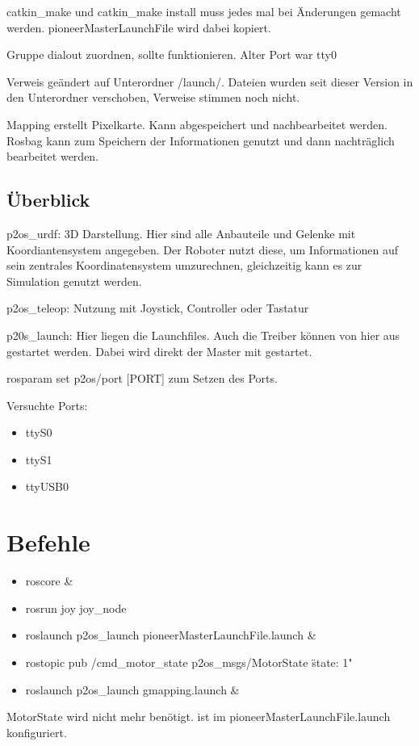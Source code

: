 \documentclass{scrartcl}%
\begin{document}
catkin\_make und catkin\_make install muss jedes mal bei Änderungen gemacht werden. pioneerMasterLaunchFile wird dabei kopiert.

Gruppe dialout zuordnen, sollte funktionieren. Alter Port war tty0

Verweis geändert auf Unterordner /launch/. Dateien wurden seit dieser Version in den Unterordner verschoben, Verweise stimmen noch nicht.

Mapping erstellt Pixelkarte. Kann abgespeichert und nachbearbeitet werden. Rosbag kann zum Speichern der Informationen genutzt und dann nachträglich bearbeitet werden.

\subsection{Überblick}
p2os\_urdf: 3D Darstellung. Hier sind alle Anbauteile und Gelenke mit Koordiantensystem angegeben. Der Roboter nutzt diese, um Informationen auf sein zentrales Koordinatensystem umzurechnen, gleichzeitig kann es zur Simulation genutzt werden.

p2os\_teleop: Nutzung mit Joystick, Controller oder Tastatur

p20s\_launch: Hier liegen die Launchfiles. Auch die Treiber können von hier aus gestartet werden. Dabei wird direkt der Master mit gestartet.

rosparam set p2os/port [PORT] zum Setzen des Ports.

Versuchte Ports: 
\begin{itemize}
	\item ttyS0
	\item ttyS1
	\item ttyUSB0
\end{itemize}

\section{Befehle}

\begin{itemize}
	\item roscore \&
	\item rosrun joy joy\_node
	\item roslaunch p2os\_launch pioneerMasterLaunchFile.launch \&
	\item rostopic pub /cmd\_motor\_state p2os\_msgs/MotorState \"state: 1"
	\item roslaunch p2os\_launch gmapping.launch \&
\end{itemize}
MotorState wird nicht mehr benötigt. ist im pioneerMasterLaunchFile.launch konfiguriert.
\end{document}
